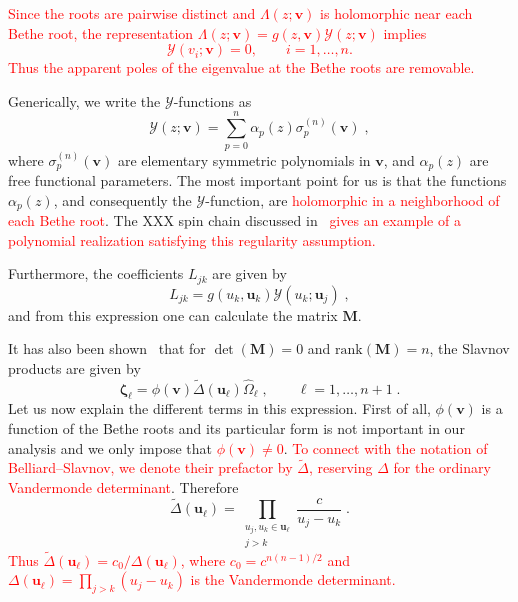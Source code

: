 \documentclass[a4paper,11pt]{amsart}
\begin{document}
\textcolor{red}{Since the roots are pairwise distinct and \(\Lambda(z;\bm{v})\) is holomorphic
near each Bethe root, the representation \(\Lambda(z;\bm{v})=g(z,\bm{v})\mathcal Y(z;\bm{v})\) implies
\begin{equation}
\mathcal Y(v_i;\bm{v})=0,\qquad i=1,\dots,n.
\end{equation}
Thus the apparent poles of the eigenvalue at the Bethe roots are removable.}

Generically, we write the \(\mathcal{Y}\)-functions as 
\begin{equation}
\label{eq:yfunc-exp}
  \mathcal{Y}(z; \bm{v}) = \sum_{p=0}^n \alpha_p(z) \sigma_p^{(n)}(\bm{v})\; , 
\end{equation}
where \(\sigma_p^{(n)}(\bm{v})\) are elementary symmetric polynomials in \(\bm{v}\), and
\(\alpha_p(z)\) are free functional parameters.  The most important point for us is that the
functions \(\alpha_p(z)\), and consequently the \(\mathcal{Y}\)-function, are
\textcolor{red}{holomorphic in a neighborhood of each Bethe root}. The XXX spin chain discussed
in~\cite{Belliard:2019bfz} \textcolor{red}{gives an example of a polynomial realization satisfying
  this regularity assumption.}

Furthermore, the coefficients \(L_{jk}\) are given by
\begin{equation}
  L_{jk} = g(u_k, \bm{u}_k) \mathcal{Y}(u_k; \bm{u}_j)\; ,
\end{equation}
and from this expression one can calculate the matrix \(\bm{M}\).

It has also been shown~\cite{Belliard:2019bfz} that for \(\det(\bm{M})
= 0\) and \(\mathrm{rank}(\bm{M}) = n\), the Slavnov products are
given by
\begin{equation}
 \bm{\zeta}_\ell = \phi(\bm{v}) \tilde{\Delta}(\bm{u}_\ell)\hat{\Omega}_\ell\; , \qquad \ell = 1, \dots, n+1\; .
\end{equation}
Let us now explain the different terms in this expression.  First of all, \(\phi(\bm{v})\) is a
function of the Bethe roots and its particular form is not important in our analysis and we only
impose that \textcolor{red}{\(\phi(\bm v)\ne 0\)}. \textcolor{red}{ To connect with the notation of
  Belliard–Slavnov, we denote their prefactor by \(\tilde{\Delta}\), reserving \(\Delta\) for the
  ordinary Vandermonde determinant}. Therefore
\begin{equation}
  \tilde{\Delta}(\bm{u}_\ell) = \prod_{\substack{u_j, u_k \in \bm{u}_\ell \\ j>k}} \frac{c}{u_j - u_k}\; .
\end{equation}
\textcolor{red}{Thus \(\tilde\Delta(\bm u_\ell)=c_0/\Delta(\bm u_\ell)\), where \(c_0=c^{n(n-1)/2}\)
  and \(\Delta(\bm u_\ell)=\prod_{j>k}(u_j-u_k)\) is the Vandermonde determinant.}
\end{document}
